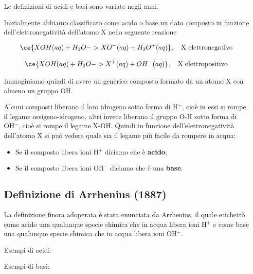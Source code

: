 
\normalsize Le definizioni di acidi e basi sono variate negli anni.

Inizialmente abbiamo classificato come acido o base un dato composto in funzione dell'elettronegatività dell'atomo X nella seguente reazione

$$\ce{XOH(aq) + H_2O -> XO^-(aq) + H_3O^+(aq)}, \quad \text{X elettronegativo}$$

$$\ce{XOH(aq) + H_2O -> X^+(aq) + OH^-(aq)}, \quad \text{X elettropositivo}$$

Immaginiamo quindi di avere un generico composto formato da un atomo X con almeno un gruppo OH.

Alcuni composti liberano il loro idrogeno sotto forma di H$^+$, cioè in essi si rompe il legame ossigeno-idrogeno, altri invece liberano il gruppo O-H sotto forma di OH$^-$, cioè si rompe il legame X-OH. Quindi in funzione dell'elettronegatività dell'atomo X si può vedere quale sia il legame più facile da rompere in acqua:

\begin{itemize}
    \item Se il composto libera ioni H$^+$ diciamo che è \textbf{acido};
    \item Se il composto libera ioni OH$^-$ diciamo che è una \textbf{base}.
\end{itemize}

\subsection{Definizione di Arrhenius (1887)}
La definizione finora adoperata è stata enunciata da Arrhenius, il quale etichettò come acido una qualunque specie chimica che in acqua libera ioni H$^+$ e come base una qualunque specie chimica che in acqua libera ioni OH$^-$.

\vspace{0.2cm}Esempi di acidi:

\vspace{0.2cm}

\vspace{0.2cm}

\vspace{0.2cm}

\vspace{0.2cm}Esempi di basi:

\vspace{0.2cm}

